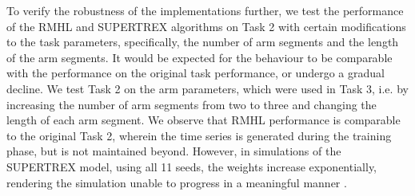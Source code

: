 To verify the robustness of the implementations further, we test the performance of the RMHL and SUPERTREX algorithms on Task 2 with certain modifications to the task parameters, specifically, the number of arm segments and the length of the arm segments. It would be expected for the behaviour to be comparable with the performance on the original task performance, or undergo a gradual decline. We test Task 2 on the arm parameters, which were used in Task 3, i.e. by increasing the number of arm segments from two to three and changing the length of each arm segment. We observe that RMHL performance is comparable to the original Task 2, wherein the time series is generated during the training phase, but is not maintained beyond. However, in simulations of the SUPERTREX model, using all 11 seeds, the weights increase exponentially, rendering the simulation unable to progress in a meaningful manner . \\
    



